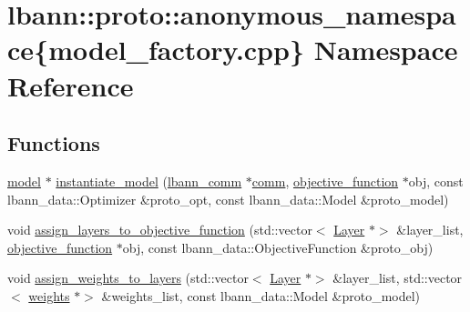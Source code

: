 \hypertarget{namespacelbann_1_1proto_1_1anonymous__namespace_02model__factory_8cpp_03}{}\section{lbann\+:\+:proto\+:\+:anonymous\+\_\+namespace\{model\+\_\+factory.\+cpp\} Namespace Reference}
\label{namespacelbann_1_1proto_1_1anonymous__namespace_02model__factory_8cpp_03}
\subsection*{Functions}
\begin{DoxyCompactItemize}
\item 
\hyperlink{classlbann_1_1model}{model} $\ast$ \hyperlink{namespacelbann_1_1proto_1_1anonymous__namespace_02model__factory_8cpp_03_a6a08f0b26d015824ef28ddbb66b6d4c0}{instantiate\+\_\+model} (\hyperlink{classlbann_1_1lbann__comm}{lbann\+\_\+comm} $\ast$\hyperlink{file__io_8cpp_ab048c6f9fcbcfaa57ce68b00263dbebe}{comm}, \hyperlink{classlbann_1_1objective__function}{objective\+\_\+function} $\ast$obj, const lbann\+\_\+data\+::\+Optimizer \&proto\+\_\+opt, const lbann\+\_\+data\+::\+Model \&proto\+\_\+model)
\item 
void \hyperlink{namespacelbann_1_1proto_1_1anonymous__namespace_02model__factory_8cpp_03_a3406a809935f319486cf8fd017b58417}{assign\+\_\+layers\+\_\+to\+\_\+objective\+\_\+function} (std\+::vector$<$ \hyperlink{classlbann_1_1Layer}{Layer} $\ast$$>$ \&layer\+\_\+list, \hyperlink{classlbann_1_1objective__function}{objective\+\_\+function} $\ast$obj, const lbann\+\_\+data\+::\+Objective\+Function \&proto\+\_\+obj)
\item 
void \hyperlink{namespacelbann_1_1proto_1_1anonymous__namespace_02model__factory_8cpp_03_a19d0eaf0259647155039ed45eb980b05}{assign\+\_\+weights\+\_\+to\+\_\+layers} (std\+::vector$<$ \hyperlink{classlbann_1_1Layer}{Layer} $\ast$$>$ \&layer\+\_\+list, std\+::vector$<$ \hyperlink{classlbann_1_1weights}{weights} $\ast$$>$ \&weights\+\_\+list, const lbann\+\_\+data\+::\+Model \&proto\+\_\+model)
\end{DoxyCompactItemize}


